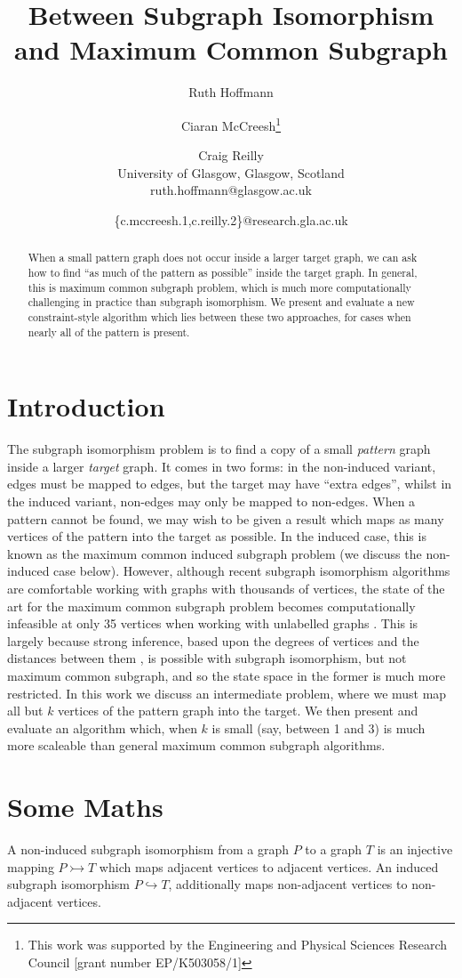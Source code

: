 \documentclass[letterpaper]{article}
\title{Between Subgraph Isomorphism and Maximum Common Subgraph}
\author{Ruth Hoffmann \and Ciaran McCreesh\thanks{This work was supported by the Engineering and Physical Sciences
Research Council [grant number EP/K503058/1]} \and Craig Reilly \\
University of Glasgow, Glasgow, Scotland \\
ruth.hoffmann@glasgow.ac.uk \and \{c.mccreesh.1,c.reilly.2\}@research.gla.ac.uk}
\begin{document}
\maketitle

\begin{abstract}
    When a small pattern graph does not occur inside a larger target graph, we can ask how to find
    ``as much of the pattern as possible'' inside the target graph. In general, this is maximum
    common subgraph problem, which is much more computationally challenging in practice than
    subgraph isomorphism. We present and evaluate a new constraint-style algorithm which lies
    between these two approaches, for cases when nearly all of the pattern is present.
\end{abstract}

\section{Introduction}

The subgraph isomorphism problem is to find a copy of a small \emph{pattern} graph inside a larger
\emph{target} graph. It comes in two forms: in the non-induced variant, edges must be mapped to
edges, but the target may have ``extra edges'', whilst in the induced variant, non-edges may only be
mapped to non-edges. When a pattern cannot be found, we may wish to be given a result which maps as
many vertices of the pattern into the target as possible. In the induced case, this is known as the
maximum common induced subgraph problem (we discuss the non-induced case below). However, although
recent subgraph isomorphism algorithms are comfortable working with graphs with thousands of
vertices, the state of the art for the maximum common subgraph problem becomes computationally
infeasible at only 35 vertices when working with unlabelled graphs \citep{CP2016MCSPaper}. This is
largely because strong inference, based upon the degrees of vertices
\citep{DBLP:journals/ai/Solnon10} and the distances between them
\citep{DBLP:conf/cp/AudemardLMGP14,DBLP:conf/cp/McCreeshP15}, is possible with subgraph isomorphism,
but not maximum common subgraph, and so the state space in the former is much more restricted. In
this work we discuss an intermediate problem, where we must map all but $k$ vertices of the pattern
graph into the target. We then present and evaluate an algorithm which, when $k$ is small (say,
between 1 and 3) is much more scaleable than general maximum common subgraph algorithms.

\section{Some Maths}
A non-induced subgraph isomorphism from a graph $P$ to a graph $T$ is an injective mapping
$P \rightarrowtail T $ which maps adjacent vertices to adjacent vertices. An induced subgraph
isomorphism $P \hookrightarrow T$, additionally maps non-adjacent vertices to non-adjacent
 vertices.
\end{document}
